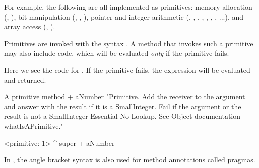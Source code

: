 \documentclass[a4paper,10pt,twoside]{book}
\begin{document}
For example, the following are all implemented as primitives:
memory allocation (, ),
bit manipulation (, , ),
pointer and integer arithmetic (\ct{+}, \ct{-},  \ct{<},  \ct{>}, \ct{*}, \ct{/ }, \ct{=}, \ct{==}...),
and array access (, ).

Primitives are invoked with the syntax .
A method that invokes such a primitive may also include \st code, which will be evaluated \emph{only} if the primitive fails.

Here we see the code for .
If the primitive fails, the expression  will be evaluated and returned.

\begin{method}[primitive]{A primitive method}
+ aNumber 
  "Primitive. Add the receiver to the argument and answer with the result
  if it is a SmallInteger. Fail if the argument or the result is not a
  SmallInteger  Essential  No Lookup. See Object documentation whatIsAPrimitive."

  <primitive: 1>
  ^ super + aNumber
\end{method}





In \pharo, the angle bracket syntax is also used for method annotations called pragmas.
\end{document}
